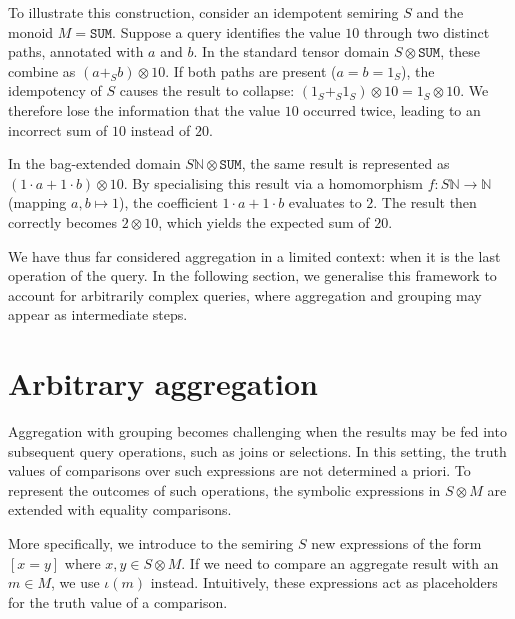 \documentclass[oneside, 11pt]{amsbook}
\theoremstyle{plain}
\theoremstyle{definition}
\theoremstyle{remark}
\begin{document}
\begin{exmpl}
    To illustrate this construction, consider an idempotent semiring $S$ and the monoid $M = \texttt{SUM}$. Suppose a query identifies the value $10$ through two distinct paths, annotated with $a$ and $b$. In the standard tensor domain $S \otimes \texttt{SUM}$, these combine as $(a +_S b) \otimes 10$. If both paths are present ($a = b = 1_S$), the idempotency of $S$ causes the result to collapse: $(1_S +_S 1_S) \otimes 10 = 1_S \otimes 10$. We therefore lose the information that the value $10$ occurred twice, leading to an incorrect sum of $10$ instead of $20$.

    In the bag-extended domain $S\mathbb{N} \otimes \texttt{SUM}$, the same result is represented as $(1 \cdot a + 1 \cdot b) \otimes 10$. By specialising this result via a homomorphism $f: S\mathbb{N} \to \mathbb{N}$ (mapping $a, b \mapsto 1$), the coefficient $1 \cdot a + 1 \cdot b$ evaluates to $2$. The result then correctly becomes $2 \otimes 10$, which yields the expected sum of $20$.
\end{exmpl}

We have thus far considered aggregation in a limited context: when it is the last operation of the query. In the following section, we generalise this framework to account for arbitrarily complex queries, where aggregation and grouping may appear as intermediate steps.

\section{Arbitrary aggregation}

Aggregation with grouping becomes challenging when the results may be fed into subsequent query operations, such as joins or selections. In this setting, the truth values of comparisons over such expressions are not determined a priori. To represent the outcomes of such operations, the symbolic expressions in $S \otimes M$ are extended with equality comparisons.

More specifically, we introduce to the semiring $S$ new expressions of the form $[x = y]$ where $x,y \in S \otimes M$. If we need to compare an aggregate result with an $m \in M$, we use $\iota(m)$ instead. Intuitively, these expressions act as placeholders for the truth value of a comparison.
\end{document}
